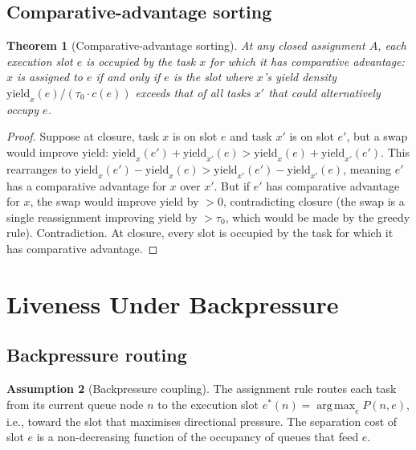 \documentclass[11pt,twocolumn,a4paper]{article}
\theoremstyle{plain}
\newtheorem{theorem}{Theorem}[section]
\theoremstyle{definition}
\newtheorem{assumption}[theorem]{Assumption}
\theoremstyle{remark}
\newcommand{\tick}{\tau_0}
\newcommand{\yield}{\mathrm{yield}}
\newcommand{\pres}{P}
\DeclareMathOperator*{\argmax}{arg\,max}
\begin{document}
\subsection{Comparative-advantage sorting}

\begin{theorem}[Comparative-advantage sorting]
\label{thm:sorting}
At any closed assignment $A$, each execution slot $e$ is occupied by the task $x$ for which it has comparative advantage: $x$ is assigned to $e$ if and only if $e$ is the slot where $x$'s yield density $\yield_x(e)/(\tick \cdot c(e))$ exceeds that of all tasks $x'$ that could alternatively occupy $e$.
\end{theorem}

\begin{proof}
Suppose at closure, task $x$ is on slot $e$ and task $x'$ is on slot $e'$, but a swap would improve yield: $\yield_x(e') + \yield_{x'}(e) > \yield_x(e) + \yield_{x'}(e')$. This rearranges to $\yield_x(e') - \yield_x(e) > \yield_{x'}(e') - \yield_{x'}(e)$, meaning $e'$ has a comparative advantage for $x$ over $x'$. But if $e'$ has comparative advantage for $x$, the swap would improve yield by $> 0$, contradicting closure (the swap is a single reassignment improving yield by $> \tick$, which would be made by the greedy rule). Contradiction. At closure, every slot is occupied by the task for which it has comparative advantage.
\end{proof}

\section{Liveness Under Backpressure}
\label{sec:liveness}

\subsection{Backpressure routing}

\begin{assumption}[Backpressure coupling]
\label{ass:backpressure}
The assignment rule routes each task from its current queue node $n$ to the execution slot $e^*(n) = \argmax_{e} \pres(n, e)$, i.e., toward the slot that maximises directional pressure. The separation cost of slot $e$ is a non-decreasing function of the occupancy of queues that feed $e$.
\end{assumption}
\end{document}

